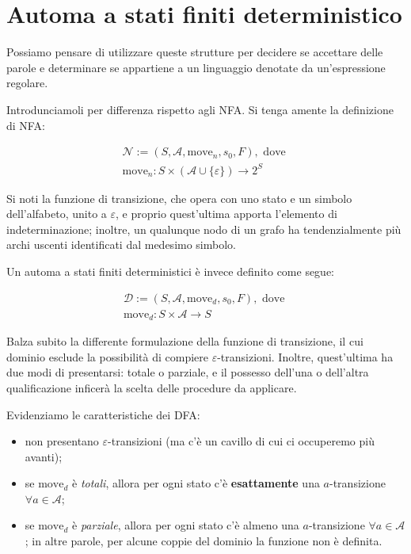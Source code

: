 \documentclass[class=book, crop=false, oneside, 12pt]{standalone}
\begin{document}
\section{Automa a stati finiti deterministico}
Possiamo pensare di utilizzare queste strutture per decidere se accettare delle parole e determinare se appartiene a un linguaggio denotate da un'espressione regolare.

Introdunciamoli per differenza rispetto agli NFA. Si tenga  amente la definizione di NFA:

\begin{gather*}
    \mathcal{N} := (S, \mathcal{A}, \textrm{move}_n, s_0, F), \textrm{ dove } \\
    \textrm{move}_n : S \times (\mathcal{A} \cup \{\varepsilon\}) \to 2^S
\end{gather*}

Si noti la funzione di transizione, che opera con uno stato e un simbolo dell'alfabeto, unito a \(\varepsilon\), e proprio quest'ultima apporta l'elemento di indeterminazione; inoltre, un qualunque nodo di un grafo ha tendenzialmente più archi uscenti identificati dal medesimo simbolo.

Un automa a stati finiti deterministici è invece definito come segue:

\begin{gather*}
    \mathcal{D} := (S, \mathcal{A}, \textrm{move}_d, s_0, F), \textrm{ dove } \\
    \textrm{move}_d : S \times \mathcal{A} \to S
\end{gather*}

Balza subito la differente formulazione della funzione di transizione, il cui dominio esclude la possibilità di compiere \(\varepsilon\)-transizioni. Inoltre, quest'ultima ha due modi di presentarsi: totale o parziale, e il possesso dell'una o dell'altra qualificazione inficerà la scelta delle procedure da applicare.

Evidenziamo le caratteristiche dei DFA:

\begin{itemize}
    \item non presentano \(\varepsilon\)-transizioni (ma c'è un cavillo di cui ci occuperemo più avanti);
    \item se \(\textrm{move}_d\) è \emph{totali}, allora per ogni stato c'è \textbf{esattamente} una \(a\)-transizione \(\forall a \in \mathcal{A}\);
    \item se \(\textrm{move}_d\) è \emph{parziale}, allora per ogni stato c'è \textrm{almeno} una \(a\)-transizione \(\forall a \in \mathcal{A}\); in altre parole, per alcune coppie del dominio la funzione non è definita.
\end{itemize}
\end{document}
